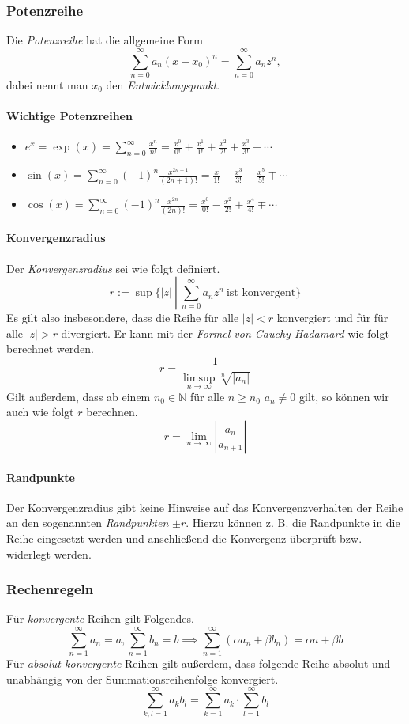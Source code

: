 \documentclass[a4paper, 9pt, DIV=24]{scrartcl}
\newcommand{\N}{\mathbb{N}}
\begin{document}
\subsubsection{Potenzreihe}
Die \emph{Potenzreihe} hat die allgemeine Form \[ \sum_{n=0}^\infty a_n (x - x_0)^n = \sum_{n=0}^\infty a_n z^n, \]
dabei nennt man $x_0$ den \emph{Entwicklungspunkt}.

\paragraph{Wichtige Potenzreihen}

\begin{itemize}
 \item $ e^x = \exp(x) = \sum_{n=0}^\infty \frac{x^n}{n!} = \frac{x^0}{0!} + \frac{x^1}{1!} + \frac{x^2}{2!} + \frac{x^3}{3!} + \cdots $
\item $ \sin (x) = \sum_{n=0}^\infty (-1)^n\frac{x^{2n+1}}{(2n+1)!} = \frac{x}{1!}-\frac{x^3}{3!}+\frac{x^5}{5!}\mp\cdots $
\item $ \cos (x) = \sum_{n=0}^\infty (-1)^n\frac{x^{2n}}{(2n)!} = \frac{x^0}{0!}-\frac{x^2}{2!}+\frac{x^4}{4!}\mp\cdots $
\end{itemize}


\paragraph{Konvergenzradius} Der \emph{Konvergenzradius} sei wie folgt definiert.
\[ r:=\sup \{ |z|\ \left|\ \sum_{n=0}^{\infty}a_n z^n\ \text{ist konvergent}\right.\}\]
Es gilt also insbesondere, dass die Reihe für alle $|z| < r$ konvergiert und für für alle $|z| > r$ divergiert.
Er kann mit der \emph{Formel von Cauchy-Hadamard} wie folgt berechnet werden.
\[ r = \frac{1}{\limsup_{n\to\infty} \sqrt[n]{|a_n|}} \]
Gilt außerdem, dass ab einem $n_0\in\N$ für alle $n \geq n_0$ $a_n \neq 0$ gilt, so können wir auch wie folgt $r$ berechnen.
\[ r = \lim_{n\to\infty} \left | \frac{a_n}{a_{n+1}} \right | \]

\paragraph{Randpunkte}
Der Konvergenzradius gibt keine Hinweise auf das Konvergenzverhalten der Reihe an den sogenannten \emph{Randpunkten} $\pm r$.
Hierzu können z. B. die Randpunkte in die Reihe eingesetzt werden und anschließend die Konvergenz überprüft bzw. widerlegt werden.

\subsubsection{Rechenregeln}
Für \emph{konvergente} Reihen gilt Folgendes.
\[
  \sum_{n=1}^\infty a_n = a, \sum_{n=1}^\infty b_n = b \implies
  \sum_{n=1}^\infty (\alpha a_n + \beta b_n) = \alpha a + \beta b
\]
Für \emph{absolut konvergente} Reihen gilt außerdem, dass folgende Reihe absolut und unabhängig von der Summationsreihenfolge konvergiert.
\[
  \sum_{k,l=1}^\infty a_k b_l = \sum_{k=1}^\infty a_k \cdot \sum_{l=1}^\infty b_l
\]
\end{document}
